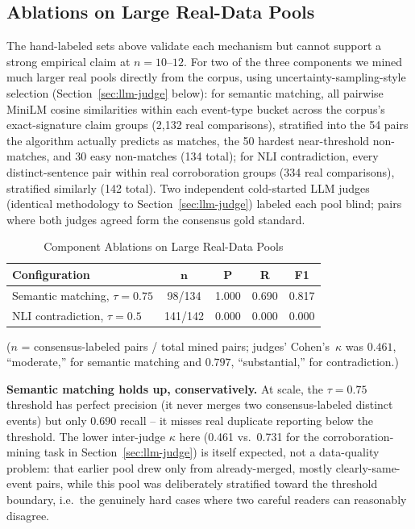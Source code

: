 \documentclass[conference]{IEEEtran}
\begin{document}
\subsection{Ablations on Large Real-Data Pools}
\label{sec:ablations-scaled}

The hand-labeled sets above validate each mechanism but cannot support a
strong empirical claim at $n{=}10$--$12$. For two of the three components we
mined much larger real pools directly from the corpus, using
uncertainty-sampling-style selection (Section~\ref{sec:llm-judge} below):
for semantic matching, all pairwise MiniLM cosine similarities within each
event-type bucket across the corpus's exact-signature claim groups (2{,}132
real comparisons), stratified into the 54 pairs the algorithm actually
predicts as matches, the 50 hardest near-threshold non-matches, and 30 easy
non-matches (134 total); for NLI contradiction, every distinct-sentence pair
within real corroboration groups (334 real comparisons), stratified
similarly (142 total). Two independent cold-started LLM judges (identical
methodology to Section~\ref{sec:llm-judge}) labeled each pool blind; pairs
where both judges agreed form the consensus gold standard.

\begin{table}[htbp]
\caption{Component Ablations on Large Real-Data Pools}
\label{tab:ablations-scaled}
\centering
\small
\begin{tabular}{lcccc}
\toprule
\textbf{Configuration} & $\boldsymbol{n}$ & \textbf{P} & \textbf{R} & \textbf{F1} \\
\midrule
Semantic matching, $\tau{=}0.75$ & 98/134 & 1.000 & 0.690 & 0.817 \\
NLI contradiction, $\tau{=}0.5$ & 141/142 & 0.000 & 0.000 & 0.000 \\
\bottomrule
\end{tabular}
\end{table}
($n$ = consensus-labeled pairs / total mined pairs; judges' Cohen's~$\kappa$
was $0.461$, ``moderate,'' for semantic matching and $0.797$, ``substantial,''
for contradiction.)

\textbf{Semantic matching holds up, conservatively.} At scale, the
$\tau{=}0.75$ threshold has perfect precision (it never merges two
consensus-labeled distinct events) but only $0.690$ recall -- it misses
real duplicate reporting below the threshold. The lower inter-judge
$\kappa$ here (0.461 vs.\ 0.731 for the corroboration-mining task in
Section~\ref{sec:llm-judge}) is itself expected, not a data-quality
problem: that earlier pool drew only from already-merged, mostly
clearly-same-event pairs, while this pool was deliberately stratified
toward the threshold boundary, i.e.\ the genuinely hard cases where two
careful readers can reasonably disagree.
\end{document}
